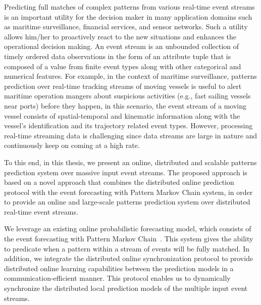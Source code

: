 \documentclass[a4paper]{article}
\theoremstyle{definition}
\begin{document}
Predicting full matches of complex patterns from various real-time event streams is an important utility for the decision maker in many application domains such as maritime surveillance, financial services, and sensor networks. Such a utility allows him/her to proactively react to the new situations and enhances the operational decision making. An event stream is an unbounded collection of timely ordered data observations in the form of an attribute tuple that is composed of a value from finite event types along with other categorical and numerical features. For example, in the context of maritime surveillance, patterns prediction over real-time tracking streams of moving vessels is useful to alert maritime operation mangers about suspicious activities (e.g., fast sailing vessels near ports) before they happen, in this scenario, the event stream of a moving vessel consists of spatial-temporal and kinematic information along with the vessel's identification and its trajectory related event types. However, processing real-time streaming data is challenging since data streams are large in nature and continuously keep on coming at a high rate. 
\par To this end, in this thesis, we present an online, distributed and scalable patterns prediction system over massive input event streams. The proposed approach is based on a novel approach that combines the  distributed online prediction protocol \citep{kamp2014communication} with the event forecasting with Pattern Markov Chain system\citep{alevizos2017event}, in order to provide an online and large-scale patterns prediction system over distributed real-time event streams. 

 \par We leverage an existing online probabilistic forecasting model, which consists of the event forecasting with Pattern Markov Chain~\citep{alevizos2017event}. This system gives the ability to predicate when a pattern within a stream of events will be fully matched. In addition, we integrate the distributed online synchronization protocol \citep{kamp2014communication} to provide distributed online learning capabilities between the prediction models in a communication-efficient manner. This protocol enables us to dynamically synchronize the distributed local prediction models of the multiple input event streams.
 
\end{document}
